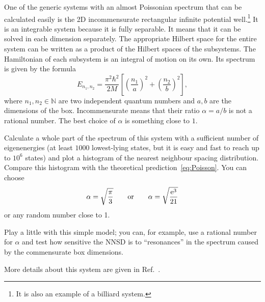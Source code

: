 \documentclass[a4paper,11pt,twoside]{article}
\begin{document}
        \begin{task}\label{task:2Dbox}
            One of the generic systems with an almost Poissonian spectrum that can be calculated easily is the 2D incommensurate rectangular infinite potential well.\footnote{It is also an example of a billiard system.}
            It is an integrable system because it is fully separable. It means that it can be solved in each dimension separately. The appropriate Hilbert space for the entire system can be written as a product of the Hilbert spaces of the subsystems. The Hamiltonian of each subsystem is an integral of motion on its own.
            Its spectrum is given by the formula
            \begin{equation}
                E_{n_{1},n_{2}}
                =\frac{\pi^{2}\hbar^{2}}{2M}\left[\left(\frac{n_{1}}{a}\right)^{2}+\left(\frac{n_{2}}{b}\right)^{2}\right],
                \label{eq:2Dbox}
            \end{equation}
            where $n_{1},n_{2}\in\mathbb{N}$ are two independent quantum numbers and $a,b$ are the dimensions of the box.
            Incommensurate means that their ratio $\alpha=a/b$ is not a rational number.
            The best choice of $\alpha$ is something close to $1$.

            Calculate a whole part of the spectrum of this system with a sufficient number of eigenenergies (at least $1000$ lowest-lying states, but it is easy and fast to reach up to $10^6$ states) and plot a histogram of the nearest neighbour spacing distribution.
            Compare this histogram with the theoretical prediction~\eqref{eq:Poisson}.
            You can choose
            \begin{equation}
                \alpha=\sqrt{\frac{\pi}{3}}\qquad\text{or}\qquad\alpha=\sqrt{\frac{\operatorname{e}^{3}}{21}}
            \end{equation}
            or any random number close to 1.

            Play a little with this simple model; you can, for example, use a rational number for $\alpha$ and test how sensitive the NNSD is to ``resonances'' in the spectrum caused by the commensurate box dimensions.

            More details about this system are given in Ref.~\cite{Cas85}.
        \end{task}
\end{document}
